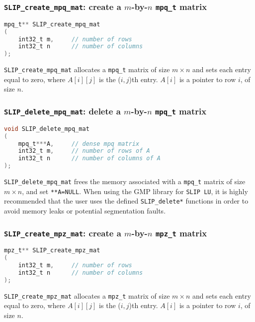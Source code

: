 \documentclass[12pt]{article}
\theoremstyle{definition}
\begin{document}
\cprotect\subsubsection{\verb|SLIP_create_mpq_mat|: create a $m$-by-$n$ \verb|mpq_t| matrix}
\label{ss:create_mpq_mat}


\begin{lstlisting}[language=C,frame=single]
mpq_t** SLIP_create_mpq_mat
(
    int32_t m,     // number of rows
    int32_t n      // number of columns
);
\end{lstlisting}

\verb|SLIP_create_mpq_mat| allocates a \verb|mpq_t| matrix of size $m \times n$ and sets each entry equal to zero, where $A[i][j]$ is the ($i,j$)th entry. $A[i]$ is a pointer to row $i$, of size $n$.

\cprotect\subsubsection{\verb|SLIP_delete_mpq_mat|: delete a $m$-by-$n$ \verb|mpq_t| matrix}


\begin{lstlisting}[language=C,frame=single]
void SLIP_delete_mpq_mat
(
    mpq_t***A,     // dense mpq matrix
    int32_t m,     // number of rows of A
    int32_t n      // number of columns of A
);
\end{lstlisting}

\verb|SLIP_delete_mpq_mat| frees the memory associated with a \verb|mpq_t| matrix of size $m \times n$, and set \verb|**A=NULL|. When using the GMP library for \verb|SLIP LU|, it is highly recommended that the user uses the defined \verb|SLIP_delete*| functions in order to avoid memory leaks or potential segmentation faults.


\cprotect\subsubsection{\verb|SLIP_create_mpz_mat|: create a $m$-by-$n$ \verb|mpz_t| matrix}

\begin{lstlisting}[language=C,frame=single]
mpz_t** SLIP_create_mpz_mat
(
    int32_t m,     // number of rows
    int32_t n      // number of columns
);
\end{lstlisting}

\verb|SLIP_create_mpz_mat| allocates a \verb|mpz_t| matrix of size $m \times n$ and sets each entry equal to zero, where $A[i][j]$ is the ($i,j$)th entry. $A[i]$ is a pointer to row $i$, of size $n$.
\end{document}
